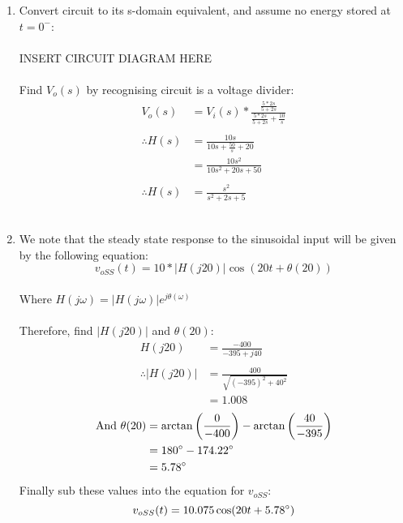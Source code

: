 \begin{enumerate}
	
	\item{
		Convert circuit to its s-domain equivalent, and assume no energy stored at $t=0^-$:
		\\ \\
		INSERT CIRCUIT DIAGRAM HERE
		\\ \\
		Find $V_o(s)$ by recognising circuit is a voltage divider:
		\begin{align*}
			V_o(s) &= V_i(s) * \frac{\frac{5*2s}{5+2s}}{\frac{5*2s}{5+2s} + \frac{10}{s}} \\ 
			\\
			\therefore H(s) &= \frac{10s}{10s+ \frac{50}{s} + 20} \\
			&= \frac{10s^2}{10s^2+20s+50} \\
			\\
			\therefore H(s) &= \frac{s^2}{s^2+2s+5}
		\end{align*}
		\\
	}

	\item{
		We note that the steady state response to the sinusoidal input will be given by the following equation:
		\begin{equation*}
			v_{oSS}(t) = 10 * |H(j20)| \cos(20t + \theta(20))
		\end{equation*}
		\\
		Where $H(j\omega) = |H(j\omega)|e^{j\theta(\omega)}$
		\\ \\
		Therefore, find $|H(j20)|$ and $\theta(20)$:
		\begin{align*}
			H(j20) &= \frac{-400}{-395+j40} \\
			\\
			\therefore |H(j20)| &= \frac{400}{\sqrt{(-395)^2+40^2}} \\
			&= 1.008
		\end{align*}
		\begin{align*}
			\mathrm{And} \ \theta(20) &= \arctan \left(\frac{0}{-400} \right) - \arctan \left(\frac{40}{-395} \right) \\
			&= 180\degree - 174.22\degree \\
			&= 5.78\degree
		\end{align*}
		Finally sub these values into the equation for $v_{oSS}$:
		\begin{equation*}
			v_{oSS}(t) = 10.075 \cos(20t+5.78\degree)
		\end{equation*}
		\\
	}

\end{enumerate}
